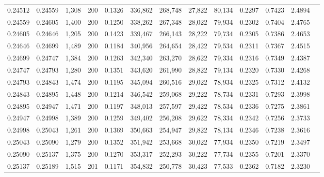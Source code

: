 \begin{tabular}{rrrrrrrrrrrrr}
0.24512 & 0.24559 & 1,308 & 200 &                                     0.1326 & 336,862 & 268,748 &  27,822 &  80,134 & 0.2297 & 0.7423 & 2.4894 \\
0.24559 & 0.24605 & 1,400 & 200 &                                     0.1250 & 338,262 & 267,348 &  28,022 &  79,934 & 0.2302 & 0.7404 & 2.4765 \\
0.24605 & 0.24646 & 1,205 & 200 &                                     0.1423 & 339,467 & 266,143 &  28,222 &  79,734 & 0.2305 & 0.7386 & 2.4653 \\
0.24646 & 0.24699 & 1,489 & 200 &                                     0.1184 & 340,956 & 264,654 &  28,422 &  79,534 & 0.2311 & 0.7367 & 2.4515 \\
0.24699 & 0.24747 & 1,384 & 200 &                                     0.1263 & 342,340 & 263,270 &  28,622 &  79,334 & 0.2316 & 0.7349 & 2.4387 \\
0.24747 & 0.24793 & 1,280 & 200 &                                     0.1351 & 343,620 & 261,990 &  28,822 &  79,134 & 0.2320 & 0.7330 & 2.4268 \\
0.24793 & 0.24843 & 1,474 & 200 &                                     0.1195 & 345,094 & 260,516 &  29,022 &  78,934 & 0.2325 & 0.7312 & 2.4132 \\
0.24843 & 0.24895 & 1,448 & 200 &                                     0.1214 & 346,542 & 259,068 &  29,222 &  78,734 & 0.2331 & 0.7293 & 2.3998 \\
0.24895 & 0.24947 & 1,471 & 200 &                                     0.1197 & 348,013 & 257,597 &  29,422 &  78,534 & 0.2336 & 0.7275 & 2.3861 \\
0.24947 & 0.24998 & 1,389 & 200 &                                     0.1259 & 349,402 & 256,208 &  29,622 &  78,334 & 0.2342 & 0.7256 & 2.3733 \\
0.24998 & 0.25043 & 1,261 & 200 &                                     0.1369 & 350,663 & 254,947 &  29,822 &  78,134 & 0.2346 & 0.7238 & 2.3616 \\
0.25043 & 0.25090 & 1,279 & 200 &                                     0.1352 & 351,942 & 253,668 &  30,022 &  77,934 & 0.2350 & 0.7219 & 2.3497 \\
0.25090 & 0.25137 & 1,375 & 200 &                                     0.1270 & 353,317 & 252,293 &  30,222 &  77,734 & 0.2355 & 0.7201 & 2.3370 \\
0.25137 & 0.25189 & 1,515 & 201 &                                     0.1171 & 354,832 & 250,778 &  30,423 &  77,533 & 0.2362 & 0.7182 & 2.3230 \\

\end{tabular}
